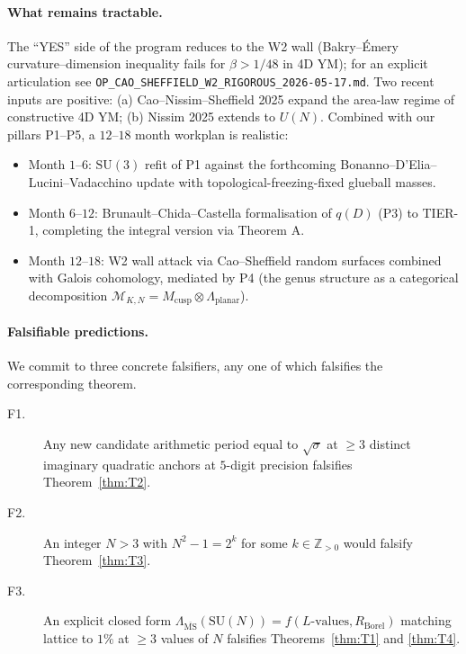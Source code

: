 \documentclass[aps,prl,reprint,superscriptaddress,floatfix,nofootinbib,amssymb]{revtex4-2}
\theoremstyle{definition}
\theoremstyle{remark}
\newcommand{\Z}{\mathbb{Z}}
\newcommand{\msb}{\overline{\mathrm{MS}}}
\begin{document}
\paragraph{What remains tractable.}
The ``YES'' side of the program reduces to the W2 wall
(Bakry--\'Emery curvature--dimension inequality
\cite{BakryEmery1985} fails for $\beta > 1/48$ in 4D YM); for an
explicit articulation see
\texttt{OP\_CAO\_SHEFFIELD\_W2\_RIGOROUS\_2026-05-17.md}. Two recent
inputs are positive: (a) Cao--Nissim--Sheffield 2025
\cite{CaoNissimSheffield2025a,CaoNissimSheffield2025b} expand the
area-law regime of constructive 4D YM; (b) Nissim 2025
\cite{Nissim2025} extends to $U(N)$. Combined with our pillars P1--P5,
a $12$--$18$ month workplan is realistic:
\begin{itemize}
\item Month $1$--$6$: $\mathrm{SU}(3)$ refit of P1 against the
forthcoming Bonanno--D'Elia--Lucini--Vadacchino update
\cite{BonannoDEliaLuciniVadacchino2022} with topological-freezing-fixed
glueball masses.
\item Month $6$--$12$: Brunault--Chida--Castella formalisation of
$q(D)$ (P3) to TIER-1, completing the integral version via
\cite{Castella2025} Theorem A.
\item Month $12$--$18$: W2 wall attack via Cao--Sheffield random
surfaces combined with Galois cohomology, mediated by P4 (the
genus structure as a categorical decomposition $\mathcal M_{K,N} =
M_{\mathrm{cusp}} \otimes \Lambda_{\mathrm{planar}}$).
\end{itemize}

\paragraph{Falsifiable predictions.}
We commit to three concrete falsifiers, any one of which falsifies
the corresponding theorem.
\begin{description}
\item[F1.] Any new candidate arithmetic period equal to
$\sqrt{\sigma}$ at $\ge 3$ distinct imaginary quadratic anchors at
$5$-digit precision falsifies Theorem~\ref{thm:T2}.
\item[F2.] An integer $N > 3$ with $N^2 - 1 = 2^k$ for some $k\in
\Z_{>0}$ would falsify Theorem~\ref{thm:T3}.
\item[F3.] An explicit closed form
$\Lambda_{\msb}(\mathrm{SU}(N)) = f(L\text{-values}, R_{\mathrm{Borel}})$
matching lattice to $1\%$ at $\ge 3$ values of $N$ falsifies
Theorems~\ref{thm:T1} and \ref{thm:T4}.
\end{description}
\end{document}
